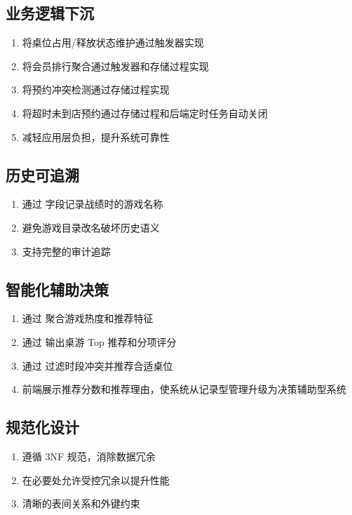 \subsection{业务逻辑下沉}

\begin{enumerate}
  \item 将桌位占用/释放状态维护通过触发器实现
  \item 将会员排行聚合通过触发器和存储过程实现
  \item 将预约冲突检测通过存储过程实现
  \item 将超时未到店预约通过存储过程和后端定时任务自动关闭
  \item 减轻应用层负担，提升系统可靠性
\end{enumerate}

\subsection{历史可追溯}

\begin{enumerate}
  \item 通过  字段记录战绩时的游戏名称
  \item 避免游戏目录改名破坏历史语义
  \item 支持完整的审计追踪
\end{enumerate}

\subsection{智能化辅助决策}

\begin{enumerate}
  \item 通过  聚合游戏热度和推荐特征
  \item 通过  输出桌游 Top 推荐和分项评分
  \item 通过  过滤时段冲突并推荐合适桌位
  \item 前端展示推荐分数和推荐理由，使系统从记录型管理升级为决策辅助型系统
\end{enumerate}

\subsection{规范化设计}

\begin{enumerate}
  \item 遵循 3NF 规范，消除数据冗余
  \item 在必要处允许受控冗余以提升性能
  \item 清晰的表间关系和外键约束
\end{enumerate}


